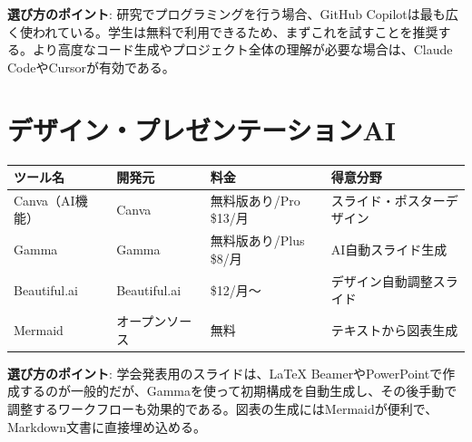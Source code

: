 \textbf{選び方のポイント}: 研究でプログラミングを行う場合、GitHub Copilotは最も広く使われている。学生は無料で利用できるため、まずこれを試すことを推奨する。より高度なコード生成やプロジェクト全体の理解が必要な場合は、Claude CodeやCursorが有効である。

\section{デザイン・プレゼンテーションAI}

\begin{table}[H]
\centering
\footnotesize
\begin{tabular}{lp{2cm}p{2.5cm}p{3cm}}
\toprule
ツール名 & 開発元 & 料金 & 得意分野 \\
\midrule
Canva（AI機能） & Canva & 無料版あり/Pro \$13/月 & スライド・ポスターデザイン \\
Gamma & Gamma & 無料版あり/Plus \$8/月 & AI自動スライド生成 \\
Beautiful.ai & Beautiful.ai & \$12/月〜 & デザイン自動調整スライド \\
Mermaid & オープンソース & 無料 & テキストから図表生成 \\
\bottomrule
\end{tabular}
\end{table}

\textbf{選び方のポイント}: 学会発表用のスライドは、\LaTeX{} BeamerやPowerPointで作成するのが一般的だが、Gammaを使って初期構成を自動生成し、その後手動で調整するワークフローも効果的である。図表の生成にはMermaidが便利で、Markdown文書に直接埋め込める。
